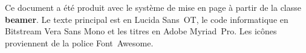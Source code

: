 {

  \begin{frame}[plain]
    \advance\textwidth-10mm
    \hsize\textwidth
    \columnwidth\textwidth %
    \scriptsize\color{lightgray} %
    \vfill
    \begin{center}
      \begin{minipage}{0.7\textwidth}
        \raggedright %
        Ce document a été produit avec le système de mise en page
        {\XeLaTeX} à partir de la classe \textbf{beamer}. Le texte
        principal est en Lucida Sans~OT, le code informatique en
        Bitstream Vera Sans Mono et les titres en Adobe Myriad~Pro. Les
        icônes proviennent de la police Font~Awesome.
      \end{minipage}
    \end{center}
    \vfill
  \end{frame}
}

